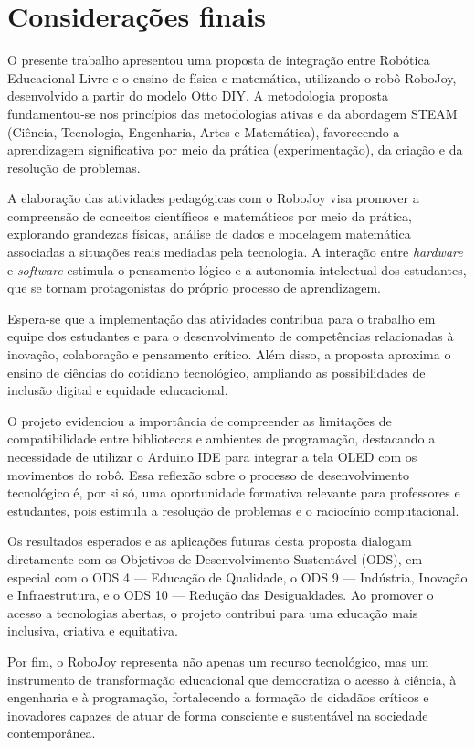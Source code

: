 \documentclass[portuguese]{textolivre}
\begin{document}
\section{Considerações finais}\label{sec-conclusoes}

O presente trabalho apresentou uma proposta de integração entre Robótica Educacional Livre e o ensino de física e matemática, utilizando o robô RoboJoy, desenvolvido a partir do modelo Otto DIY. A metodologia proposta fundamentou-se nos princípios das metodologias ativas e da abordagem STEAM (Ciência, Tecnologia, Engenharia, Artes e Matemática), favorecendo a aprendizagem significativa por meio da prática (experimentação), da criação e da resolução de problemas.

A elaboração das atividades pedagógicas com o RoboJoy visa promover a compreensão de conceitos científicos e matemáticos por meio da prática, explorando grandezas físicas, análise de dados e modelagem matemática associadas a situações reais mediadas pela tecnologia. A interação entre \textit{hardware} e \textit{software} estimula o pensamento lógico e a autonomia intelectual dos estudantes, que se tornam protagonistas do próprio processo de aprendizagem.

Espera-se que a implementação das atividades contribua para o trabalho em equipe dos estudantes e para o desenvolvimento de competências relacionadas à inovação, colaboração e pensamento crítico. Além disso, a proposta aproxima o ensino de ciências do cotidiano tecnológico, ampliando as possibilidades de inclusão digital e equidade educacional.

O projeto evidenciou a importância de compreender as limitações de compatibilidade entre bibliotecas e ambientes de programação, destacando a necessidade de utilizar o Arduino IDE para integrar a tela OLED com os movimentos do robô. Essa reflexão sobre o processo de desenvolvimento tecnológico é, por si só, uma oportunidade formativa relevante para professores e estudantes, pois estimula a resolução de problemas e o raciocínio computacional.

Os resultados esperados e as aplicações futuras desta proposta dialogam diretamente com os Objetivos de Desenvolvimento Sustentável (ODS), em especial com o ODS 4 — Educação de Qualidade, o ODS 9 — Indústria, Inovação e Infraestrutura, e o ODS 10 — Redução das Desigualdades. Ao promover o acesso a tecnologias abertas, o projeto contribui para uma educação mais inclusiva, criativa e equitativa.

Por fim, o RoboJoy representa não apenas um recurso tecnológico, mas um instrumento de transformação educacional que democratiza o acesso à ciência, à engenharia e à programação, fortalecendo a formação de cidadãos críticos e inovadores capazes de atuar de forma consciente e sustentável na sociedade contemporânea.
\end{document}

